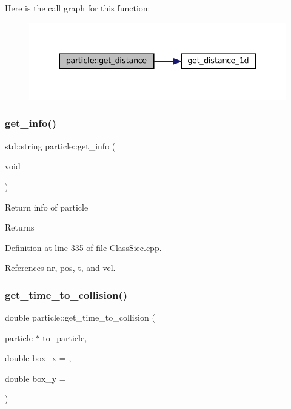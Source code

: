 Here is the call graph for this function\+:\nopagebreak
\begin{figure}[H]
\begin{center}
\leavevmode
\includegraphics[width=334pt]{structparticle_ab28d2ff9718bfa0fb801275d90f36a9d_cgraph}
\end{center}
\end{figure}
\mbox{\label{structparticle_a74457d580da5637e77c1d72ba7a31bb5}} 
\subsubsection{\texorpdfstring{get\+\_\+info()}{get\_info()}}
{\footnotesize\ttfamily std\+::string particle\+::get\+\_\+info (\begin{DoxyParamCaption}\item[{void}]{ }\end{DoxyParamCaption})}

Return info of particle \begin{DoxyReturn}{Returns}

\end{DoxyReturn}


Definition at line 335 of file Class\+Siec.\+cpp.



References nr, pos, t, and vel.

\mbox{\label{structparticle_a8075edc35cef018e8d5fabcce3bc099e}} 
\subsubsection{\texorpdfstring{get\+\_\+time\+\_\+to\+\_\+collision()}{get\_time\_to\_collision()}}
{\footnotesize\ttfamily double particle\+::get\+\_\+time\+\_\+to\+\_\+collision (\begin{DoxyParamCaption}\item[{\mbox{\hyperlink{structparticle}{particle}} $\ast$}]{to\+\_\+particle,  }\item[{double}]{box\+\_\+x = {},  }\item[{double}]{box\+\_\+y = {} }\end{DoxyParamCaption})}

